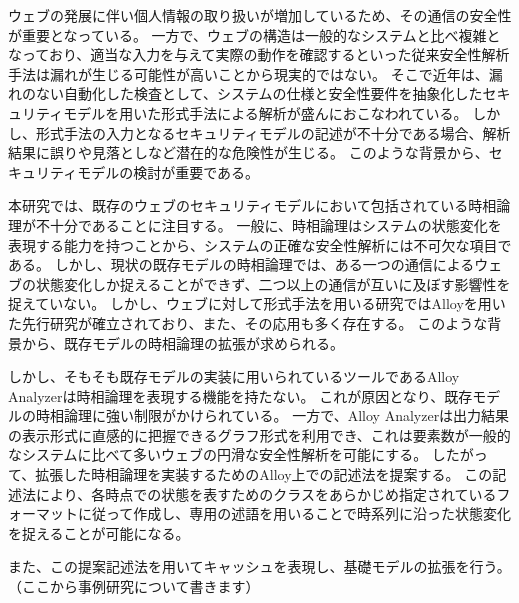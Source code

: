 \documentclass[12pt,a4paper]{jbook}
\begin{document}
ウェブの発展に伴い個人情報の取り扱いが増加しているため、その通信の安全性が重要となっている。
一方で、ウェブの構造は一般的なシステムと比べ複雑となっており、適当な入力を与えて実際の動作を確認するといった従来安全性解析手法は漏れが生じる可能性が高いことから現実的ではない。
そこで近年は、漏れのない自動化した検査として、システムの仕様と安全性要件を抽象化したセキュリティモデルを用いた形式手法による解析が盛んにおこなわれている。
しかし、形式手法の入力となるセキュリティモデルの記述が不十分である場合、解析結果に誤りや見落としなど潜在的な危険性が生じる。
このような背景から、セキュリティモデルの検討が重要である。

本研究では、既存のウェブのセキュリティモデルにおいて包括されている時相論理が不十分であることに注目する。
一般に、時相論理はシステムの状態変化を表現する能力を持つことから、システムの正確な安全性解析には不可欠な項目である。
しかし、現状の既存モデルの時相論理では、ある一つの通信によるウェブの状態変化しか捉えることができず、二つ以上の通信が互いに及ぼす影響性を捉えていない。
\color{red}
しかし、ウェブに対して形式手法を用いる研究ではAlloyを用いた先行研究が確立されており、また、その応用も多く存在する。
このような背景から、既存モデルの時相論理の拡張が求められる。

しかし、そもそも既存モデルの実装に用いられているツールであるAlloy Analyzerは時相論理を表現する機能を持たない。
これが原因となり、既存モデルの時相論理に強い制限がかけられている。
一方で、Alloy Analyzerは出力結果の表示形式に直感的に把握できるグラフ形式を利用でき、これは要素数が一般的なシステムに比べて多いウェブの円滑な安全性解析を可能にする。
したがって、拡張した時相論理を実装するためのAlloy上での記述法を提案する。
この記述法により、各時点での状態を表すためのクラスをあらかじめ指定されているフォーマットに従って作成し、専用の述語を用いることで時系列に沿った状態変化を捉えることが可能になる。

また、この提案記述法を用いてキャッシュを表現し、基礎モデルの拡張を行う。
\color{black}
\\（ここから事例研究について書きます）
\end{document}
